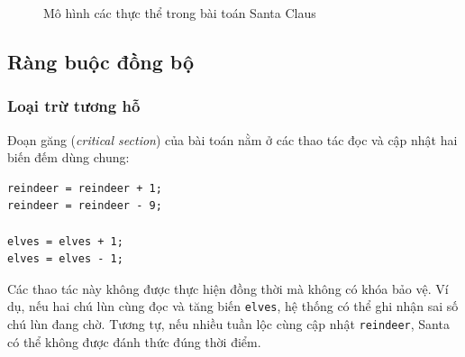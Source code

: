 \begin{figure}[H]
\centering
{}
\caption{Mô hình các thực thể trong bài toán Santa Claus}
\label{fig:santa-model}

\end{figure}


\subsection{Ràng buộc đồng bộ}

\subsubsection*{Loại trừ tương hỗ}

Đoạn găng (\textit{critical section}) của bài toán nằm ở các thao tác
đọc và cập nhật hai biến đếm dùng chung:

\begin{lstlisting}
reindeer = reindeer + 1;
reindeer = reindeer - 9;

elves = elves + 1;
elves = elves - 1;
\end{lstlisting}

Các thao tác này không được thực hiện đồng thời mà không có khóa bảo vệ.
Ví dụ, nếu hai chú lùn cùng đọc và tăng biến \texttt{elves}, hệ thống
có thể ghi nhận sai số chú lùn đang chờ. Tương tự, nếu nhiều tuần lộc
cùng cập nhật \texttt{reindeer}, Santa có thể không được đánh thức đúng
thời điểm.

